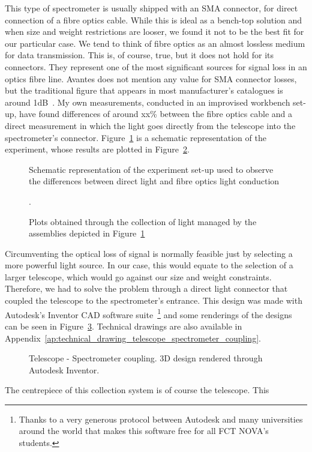 This type of spectrometer is usually shipped with an \gls{SMA}
connector, for direct connection of a fibre optics cable. While this is
ideal as a bench-top solution and when size and weight restrictions are
looser, we found it not to be the best fit for our particular case. We
tend to think of fibre optics as an almost lossless medium for data
transmission. This is, of course, true, but it does not hold for its
connectors. They represent one of the most significant sources for
signal loss in an optics fibre line. Avantes does not mention any value
for \gls{SMA} connector losses, but the traditional figure that appears
in most manufacturer's catalogues is around 1dB~. My own measurements,
conducted in an improvised workbench set-up, have found differences of
around xx\% between the fibre optics cable and a
direct measurement in which the light goes directly from the telescope
into the spectrometer's connector.
Figure~\ref{fig:direct_vs_optical_assmbly} is a schematic representation
of the experiment, whose results are plotted in
Figure~\ref{fig:direct_vs_optical_plot}.

\begin{figure}[htpb]
    \centering
    \missingfigure{}
    \caption{Schematic representation of the experiment set-up used to
    observe the differences between direct light and fibre optics light
    conduction}%
    \label{fig:direct_vs_optical_assmbly}
\end{figure}

\begin{figure}[htpb]
    \centering
    \missingfigure{}
    \caption{Plots obtained through the collection of light managed by
    the assemblies depicted in
    Figure~\ref{fig:direct_vs_optical_assmbly}}.%
    \label{fig:direct_vs_optical_plot}
\end{figure}

Circumventing the optical loss of signal is normally feasible just by
selecting a more powerful light source. In our case, this would equate
to the selection of a larger telescope, which would go against our size
and weight constraints. Therefore, we had to solve the problem through a
direct light connector that coupled the telescope to the spectrometer's
entrance. This design was made with Autodesk's Inventor CAD software
suite~\footnote{Thanks to a very generous protocol between Autodesk and
many universities around the world that makes this software free for all
FCT NOVA's students.} and some renderings of the designs can be seen in
Figure~\ref{fig:spectrometer_telescope_coupling_3d}. Technical drawings
are also available in
Appendix~\ref{ap:technical_drawing_telescope_spectrometer_coupling}.

\begin{figure}[htpb]
    \centering
    \missingfigure{}
    \caption{Telescope - Spectrometer coupling. 3D design rendered
    through Autodesk Inventor.}%
    \label{fig:spectrometer_telescope_coupling_3d}
\end{figure}

The centrepiece of this collection system is of course the telescope.
This 




